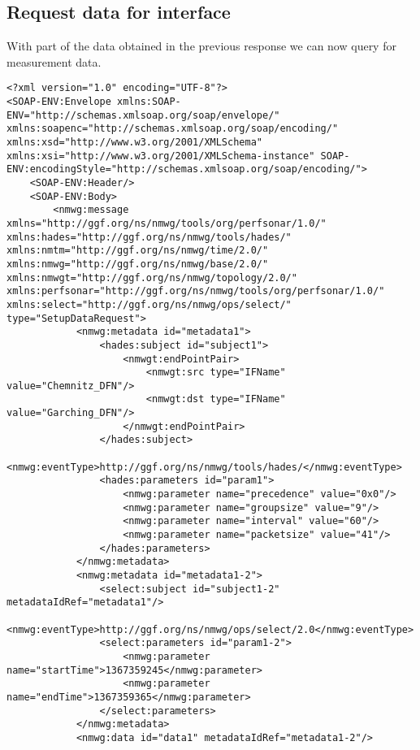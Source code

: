 \documentclass[a4paper,12pt,titlepage,hidelinks,fleqn]{article}
\begin{document}
\subsection{Request data for interface}
\begin{flushleft}
With part of the data obtained in the previous response we can now query for measurement data. 
\begin{framed}
\begin{lstlisting}
<?xml version="1.0" encoding="UTF-8"?>
<SOAP-ENV:Envelope xmlns:SOAP-ENV="http://schemas.xmlsoap.org/soap/envelope/" xmlns:soapenc="http://schemas.xmlsoap.org/soap/encoding/" xmlns:xsd="http://www.w3.org/2001/XMLSchema" xmlns:xsi="http://www.w3.org/2001/XMLSchema-instance" SOAP-ENV:encodingStyle="http://schemas.xmlsoap.org/soap/encoding/">
	<SOAP-ENV:Header/>
	<SOAP-ENV:Body>
		<nmwg:message xmlns="http://ggf.org/ns/nmwg/tools/org/perfsonar/1.0/" xmlns:hades="http://ggf.org/ns/nmwg/tools/hades/" xmlns:nmtm="http://ggf.org/ns/nmwg/time/2.0/" xmlns:nmwg="http://ggf.org/ns/nmwg/base/2.0/" xmlns:nmwgt="http://ggf.org/ns/nmwg/topology/2.0/" xmlns:perfsonar="http://ggf.org/ns/nmwg/tools/org/perfsonar/1.0/" xmlns:select="http://ggf.org/ns/nmwg/ops/select/" type="SetupDataRequest">
			<nmwg:metadata id="metadata1">
				<hades:subject id="subject1">
					<nmwgt:endPointPair>
						<nmwgt:src type="IFName" value="Chemnitz_DFN"/>
						<nmwgt:dst type="IFName" value="Garching_DFN"/>
					</nmwgt:endPointPair>
				</hades:subject>
				<nmwg:eventType>http://ggf.org/ns/nmwg/tools/hades/</nmwg:eventType>
				<hades:parameters id="param1">
					<nmwg:parameter name="precedence" value="0x0"/>
					<nmwg:parameter name="groupsize" value="9"/>
					<nmwg:parameter name="interval" value="60"/>
					<nmwg:parameter name="packetsize" value="41"/>
				</hades:parameters>
			</nmwg:metadata>
			<nmwg:metadata id="metadata1-2">
				<select:subject id="subject1-2" metadataIdRef="metadata1"/>
				<nmwg:eventType>http://ggf.org/ns/nmwg/ops/select/2.0</nmwg:eventType>				
				<select:parameters id="param1-2"> 
					<nmwg:parameter name="startTime">1367359245</nmwg:parameter>
					<nmwg:parameter name="endTime">1367359365</nmwg:parameter>
				</select:parameters>
			</nmwg:metadata>
			<nmwg:data id="data1" metadataIdRef="metadata1-2"/>
			

\end{lstlisting}
\end{framed}
\end{flushleft}
\end{document}
